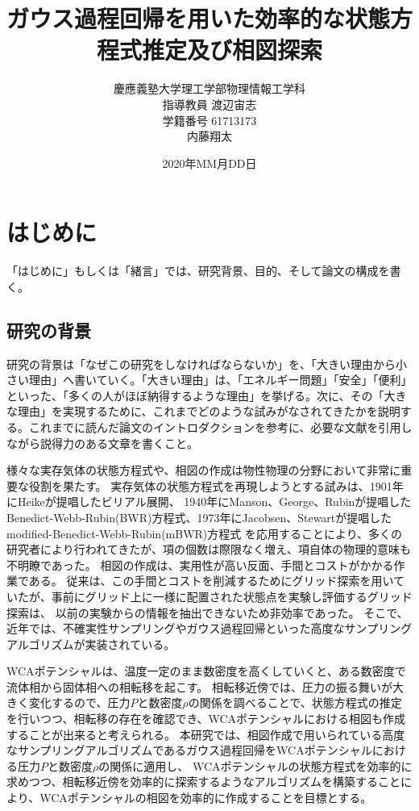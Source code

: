 \documentclass[titlepage]{jsreport}
\title{ガウス過程回帰を用いた効率的な状態方程式推定及び相図探索}
\author{慶應義塾大学理工学部物理情報工学科\\
指導教員 渡辺宙志\\
学籍番号 61713173\\
内藤翔太}
\date{2020年MM月DD日}
\begin{document}
\maketitle

\tableofcontents

\chapter{はじめに} \label{chap:introduction}

「はじめに」もしくは「緒言」では、研究背景、目的、そして論文の構成を書く。

\section{研究の背景}

研究の背景は「なぜこの研究をしなければならないか」を、「大きい理由から小さい理由」へ書いていく。「大きい理由」は、「エネルギー問題」「安全」「便利」といった、「多くの人がほぼ納得するような理由」を挙げる。次に、その「大きな理由」を実現するために、これまでどのような試みがなされてきたかを説明する。これまでに読んだ論文のイントロダクションを参考に、必要な文献を引用しながら説得力のある文章を書くこと。

様々な実存気体の状態方程式や、相図の作成は物性物理の分野において非常に重要な役割を果たす。
実存気体の状態方程式を再現しようとする試みは、1901年にHeikeが提唱したビリアル展開\cite{virial-Heike}、
1940年にManson、George、Rubinが提唱したBenedict-Webb-Rubin(BWR)方程式\cite{BWR-equation:original}、1973年にJacobsen、Stewartが提唱したmodified-Benedict-Webb-Rubin(mBWR)方程式\cite{m-BWR-equation}
を応用することにより、多くの研究者により行われてきた\cite{MCCARTY1974276,BWR-equation:13,BWR-equation:25}が、項の個数は際限なく増え、項自体の物理的意味も不明瞭であった。
相図の作成は、実用性が高い反面、手間とコストがかかる作業である。
従来は、この手間とコストを削減するためにグリッド探索\cite{grid1,grid2}を用いていたが、事前にグリッド上に一様に配置された状態点を実験し評価するグリッド探索は、
以前の実験からの情報を抽出できないため非効率であった。
そこで、近年では、不確実性サンプリング\cite{uncertainty-sampling1,uncertainty-sampling2}やガウス過程回帰\cite{gaussian-phase}といった高度なサンプリングアルゴリズムが実装されている。




WCAポテンシャルは、温度一定のまま数密度を高くしていくと、ある数密度で流体相から固体相への相転移を起こす。
相転移近傍では、圧力の振る舞いが大きく変化するので、圧力$P$と数密度$\rho$の関係を調べることで、状態方程式の推定を行いつつ、相転移の存在を確認でき、WCAポテンシャルにおける相図も作成することが出来ると考えられる。
本研究では、相図作成で用いられている高度なサンプリングアルゴリズムであるガウス過程回帰をWCAポテンシャルにおける圧力$P$と数密度$\rho$の関係に適用し、
WCAポテンシャルの状態方程式を効率的に求めつつ、相転移近傍を効率的に探索するようなアルゴリズムを構築することにより、WCAポテンシャルの相図を効率的に作成することを目標とする。
\end{document}
